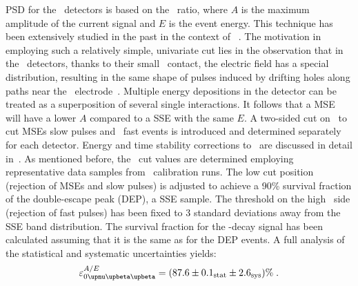 PSD for the \bege\ detectors is based on the \aoe\ ratio, where $A$ is the maximum
amplitude of the current signal and $E$ is the event energy. This technique has been
extensively studied in the past in the context of \gerda~\cite{Agostini2013, Agostini2010,
Budjas2008, Budjas2009, Budjas2009a, Agostini2010a}. The motivation in employing such a
relatively simple, univariate cut lies in the observation that in the \bege\ detectors,
thanks to their small \pplus\ contact, the electric field has a special distribution,
resulting in the same shape of pulses induced by drifting holes along paths near the
\pplus\ electrode~\cite{Agostini2010}. Multiple energy depositions in the detector can be
treated as a superposition of several single interactions. It follows that a MSE will have
a lower $A$ compared to a SSE with the same $E$.  A two-sided cut on \aoe\ to cut MSEs
slow pulses and \pplus\ fast events is introduced and determined separately for each
detector. Energy and time stability corrections to \aoe\ are discussed in detail
in~\cite{psd-paper}. As mentioned before, the \aoe\ cut values are determined employing
representative data samples from \Th\ calibration runs.  The low cut position (rejection
of MSEs and slow pulses) is adjusted to achieve a 90\% survival fraction of the
double-escape peak (DEP), a SSE sample. The threshold on the high \aoe\
side (rejection of fast pulses) has been fixed to 3 standard deviations away from the SSE
band distribution. The survival fraction for the \onbb-decay signal has been
calculated assuming that it is the same as for the DEP events. A full analysis of the
statistical and systematic uncertainties yields:
\[
  \epsilon_\onbbM^{A/E} = (87.6 \pm \stat{0.1} \pm \syst{2.6}) \% \;.
\]

